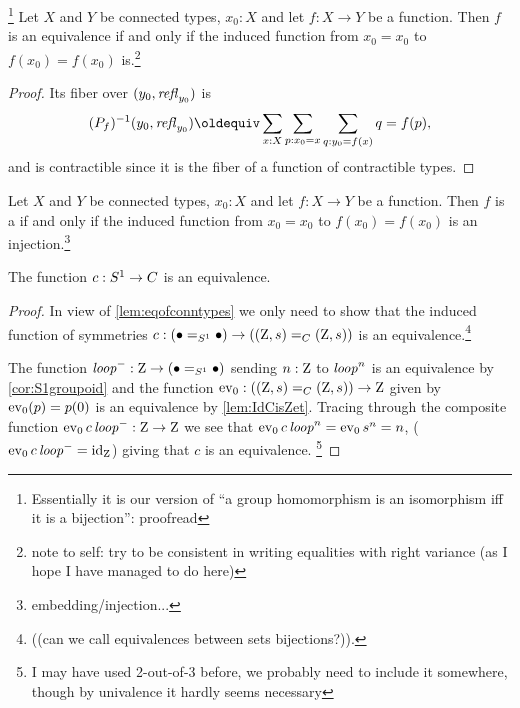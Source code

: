 \begin{lemma}\label{lem:eqofconntypes}\footnote{
Essentially it is our version of ``a group homomorphism is an isomorphism iff it is a bijection'': proofread}
  Let $X$ and $Y$ be connected types, $x_0:X$ and let $f:X\to Y$ be a function.  Then $f$ is an equivalence if and only if the induced function from $x_0=x_0$ to $f(x_0)=f(x_0)$ is.\footnote{note to self: try to be consistent in writing equalities with right variance (as I hope I have managed to do here)}
\end{lemma}
\begin{proof}
  

 Its fiber over $(y_0,\mathop{{\it refl}_{y_0}})$ is 
$$(P_f)^{-1}(y_0,\refl{y_0})\oldequiv\sum_{x:X}\sum_{p:x_0=x}\sum_{q:y_0=f(x)}q=f(p),$$ and is contractible since it is the fiber of a function of contractible types.  
\end{proof}
\begin{lemma}
  Let $X$ and $Y$ be connected types, $x_0:X$ and let $f:X\to Y$ be a function.  Then $f$ is a \covering if and only if the induced function from $x_0=x_0$ to $f(x_0)=f(x_0)$ is an injection.\footnote{embedding/injection...}
\end{lemma}



\begin{theorem}\label{thm:S1bysymmetries}
  The function $c:S^1\to C$ is an equivalence.
\end{theorem}
\begin{proof}
  In view of \cref{lem:eqofconntypes} we only need to show that the induced function of symmetries $c:(\bullet=_{S^1}\bullet)\to((\mathrm{Z},s)=_C(\mathrm{Z},s))$ is an equivalence.\footnote{ ((can we call equivalences between sets bijections?)).}  

The function $\mathit{loop}^-:\mathrm{Z}\to (\bullet=_{S^1}\bullet)$ sending $n:\mathrm{Z}$ to $\mathit{loop}^n$ is an equivalence by  \cref{cor:S1groupoid} and the function  $\mathrm{ev}_0:((\mathrm{Z},s)=_C(\mathrm{Z},s))\to \mathrm{Z}$ given by $\mathrm{ev}_0(p)=p(0)$ is an equivalence by \cref{lem:IdCisZet}.  Tracing through the composite function $\mathrm{ev}_0\,c\,\mathit{loop}^-:\mathrm{Z}\to\mathrm{Z}$ we see that $\mathrm{ev}_0\,c\,\mathit{loop}^n=\mathrm{ev}_0\,s^n=n$, (\ie $\mathrm{ev}_0\,c\,\mathit{loop}^-=\mathord{\mathrm{id}}_{\mathrm{Z}}$) giving that $c$ is an equivalence. 
\footnote{I may have used 2-out-of-3 before, we probably need to include it somewhere, though by univalence it hardly seems necessary}%
\end{proof}

